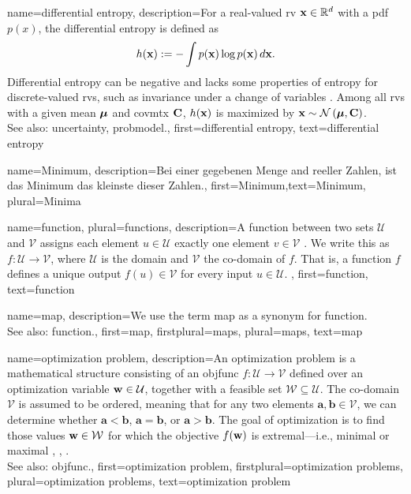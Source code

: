 {name={differential entropy},
	description={For a real-valued \gls{rv} ${\bf x} \in \mathbb{R}^{d}$ 
		with a \gls{pdf} $p(x)$, the differential \gls{entropy} is defined as \cite{coverthomas}
		\[
		h({\bf x}) := - \int p({\bf x}) \log p({\bf x}) \, d{\bf x}.
		\]
		Differential \gls{entropy} can be negative and lacks some properties of \gls{entropy} for 
		discrete-valued \glspl{rv}, such as invariance under a change of variables \cite{coverthomas}. 
		Among all \glspl{rv} with a given \gls{mean} ${\bm \mu}$ and \gls{covmtx} ${\bf C}$, 
		$h({\bf x})$ is maximized by ${\bf x} \sim \mathcal{N}\left({\bm \mu},{\bf C}\right)$. 
		\\
		See also: \gls{uncertainty}, \gls{probmodel}.},
	first={differential entropy},
	text={differential entropy}
}

{name=Minimum,
 description={Bei einer gegebenen Menge and reeller Zahlen, ist das Minimum  das kleinste dieser Zahlen.},
 first={Minimum},text={Minimum}, plural={Minima}
}

{name={function}, plural={functions}, 
	description={A function between two sets $\mathcal{U}$ and $\mathcal{V}$ assigns  
		each element $u \in \mathcal{U}$ exactly one element $v \in \mathcal{V}$ \cite{RudinBookPrinciplesMatheAnalysis}.
		We write this as $f: \mathcal{U} \rightarrow \mathcal{V}$, where $\mathcal{U}$ is the domain 
		and $\mathcal{V}$ the co-domain of $f$. That is, a function $f$ defines a unique 
		output $f(u) \in \mathcal{V}$ for every input $u \in \mathcal{U}$. },
	first={function},
	text={function}
}


{name={map}, 
	description={We use the term map as a synonym for \gls{function}.
		\\
		See also: \gls{function}.},
	first={map},
	firstplural={maps},	
	plural={maps},
	text={map}
}


{name={optimization problem}, 
	description={An optimization problem is a mathematical 
		   structure consisting of an \gls{objfunc} $f: \mathcal{U} \rightarrow \mathcal{V}$ 
		   defined over an optimization variable ${\bf w} \in \mathcal{U}$, together with a 
		   feasible set $\mathcal{W} \subseteq \mathcal{U}$. The co-domain $\mathcal{V}$ is 
		   assumed to be ordered, meaning that for any two elements $\mathbf{a}, \mathbf{b} \in \mathcal{V}$, 
		   we can determine whether $\mathbf{a} < \mathbf{b}$, $\mathbf{a} = \mathbf{b}$, 
		   or $\mathbf{a} > \mathbf{b}$. The goal of optimization is to find those values ${\bf w} \in \mathcal{W}$ 
		   for which the objective $f({\bf w})$ is extremal—i.e., minimal or maximal \cite{BoydConvexBook}, \cite{BertsekasNonLinProgr}, \cite{nesterov04}.
		   \\
		   See also: \gls{objfunc}.},
	first={optimization problem},
	firstplural={optimization problems}, 
	plural={optimization problems}, 
	text={optimization problem}
}

